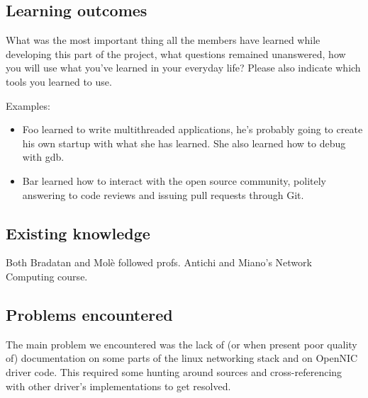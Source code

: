 \documentclass[10pt,a4]{article}
\begin{document}
\subsection{Learning outcomes}

What was the most important thing all the members have learned while
developing this part of the project, what questions remained unanswered,
how you will use what you've learned in your everyday life?
Please also indicate which tools you learned to use.

Examples:

\begin{itemize}
\item Foo learned to write multithreaded applications, he's probably going to
  create his own startup with what she has learned. She also learned how to
  debug with gdb.
\item Bar learned how to interact with the open source community, politely
  answering to code reviews and issuing pull requests through Git.
\end{itemize}

\subsection{Existing knowledge}

Both Bradatan and Molè followed profs. Antichi and Miano's Network Computing
course.


\subsection{Problems encountered}
%

The main problem we encountered was the lack of (or when present
poor quality of) documentation on some parts of the linux networking stack and
on OpenNIC driver code. This required some hunting around sources and
cross-referencing with other driver's implementations to get resolved.
\end{document}
